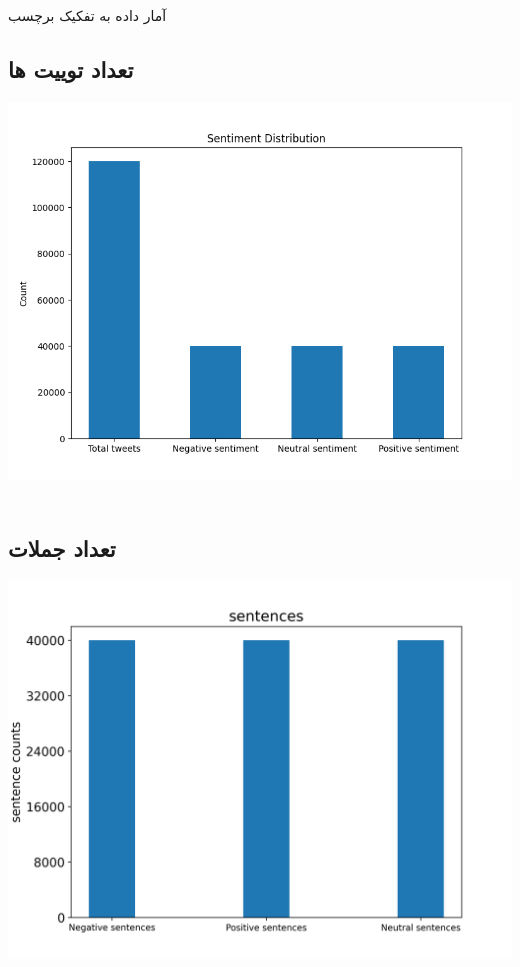 \Section
{آمار داده به تفکیک برچسب}
{
	\subsection{تعداد توییت ها}
	{
	}
	\begin{center}
		\includegraphics[scale=0.75]{../stats/sentiment_distribution.png}
	\end{center}
	\begin{align*}
	\end{align*}
	\newpage
	\subsection{تعداد جملات}
	{
		\begin{center}
			\includegraphics[scale=0.75]{../stats/sentences_for_each_label.png}
		\end{center}
		\begin{align*}
		\end{align*}
	}
	\newpage
}
